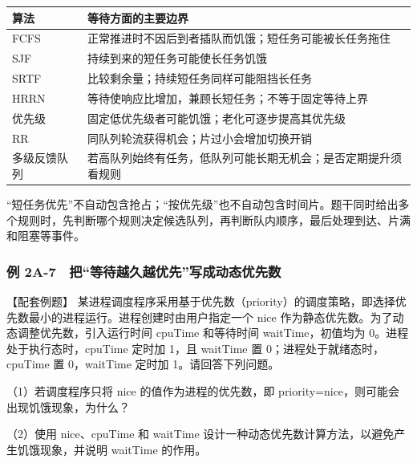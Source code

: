 \begin{wideblock}

\par\medskip\noindent\begin{minipage}{\linewidth}\fontsize{9.3}{12}\selectfont\begin{tabularx}{\linewidth}{@{}YY@{}}
\toprule\noalign{}
\begin{minipage}[b]{\linewidth}\raggedright
算法
\end{minipage} & \begin{minipage}[b]{\linewidth}\raggedright
等待方面的主要边界
\end{minipage} \\
\midrule\noalign{}


FCFS & 正常推进时不因后到者插队而饥饿；短任务可能被长任务拖住 \\
SJF & 持续到来的短任务可能使长任务饥饿 \\
SRTF & 比较剩余量；持续短任务同样可能阻挡长任务 \\
HRRN & 等待使响应比增加，兼顾长短任务；不等于固定等待上界 \\
优先级 & 固定低优先级者可能饥饿；老化可逐步提高其优先级 \\
RR & 同队列轮流获得机会；片过小会增加切换开销 \\
多级反馈队列 & 若高队列始终有任务，低队列可能长期无机会；是否定期提升须看规则 \\
\bottomrule\end{tabularx}
\end{minipage}\par\medskip

\end{wideblock}

``短任务优先''不自动包含抢占；``按优先级''也不自动包含时间片。题干同时给出多个规则时，先判断哪个规则决定候选队列，再判断队内顺序，最后处理到达、片满和阻塞等事件。

\subsubsection{例 2A-7　把``等待越久越优先''写成动态优先数}\label{OS02-ex2-7}

\begin{example}[配套例题]

【配套例题】 某进程调度程序采用基于优先数（priority）的调度策略，即选择优先数最小的进程运行。进程创建时由用户指定一个 nice 作为静态优先数。为了动态调整优先数，引入运行时间 cpuTime 和等待时间 waitTime，初值均为 0。进程处于执行态时，cpuTime 定时加 1，且 waitTime 置 0；进程处于就绪态时，cpuTime 置 0，waitTime 定时加 1。请回答下列问题。

（1）若调度程序只将 nice 的值作为进程的优先数，即 priority=nice，则可能会出现饥饿现象，为什么？

（2）使用 nice、cpuTime 和 waitTime 设计一种动态优先数计算方法，以避免产生饥饿现象，并说明 waitTime 的作用。

\end{example}

